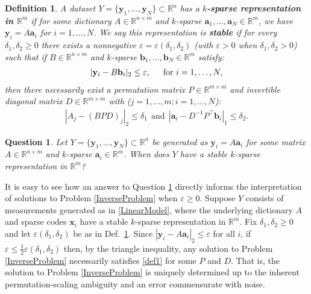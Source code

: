 \documentclass[journal, twocolumn]{IEEEtran}
\newtheorem{question}{Question}
\newtheorem{definition}{Definition}
\begin{document}
\begin{definition}\label{Uniqueness}
A dataset $Y = \{\mathbf{y}_1, \ldots, \mathbf{y}_N\} \subset \mathbb{R}^n$ has a \textbf{$k$-sparse representation in $\mathbb{R}^m$} if for some dictionary $A \in \mathbb{R}^{n \times m}$ and $k$-sparse $\mathbf{a}_1, \ldots, \mathbf{a}_N \in \mathbb{R}^m$, we have $\mathbf{y}_i = A\mathbf{a}_i$ for $i = 1, \ldots, N$. We say this representation is \textbf{stable} if for every $\delta_1, \delta_2 \geq 0$ there exists a nonnegative $\varepsilon = \varepsilon(\delta_1, \delta_2)$ (with $\varepsilon > 0$ when  $\delta_1, \delta_2 > 0$) such that if $B \in \mathbb{R}^{n \times m}$ and $k$-sparse $\mathbf{b}_1, \ldots, \mathbf{b}_N \in \mathbb{R}^m$ satisfy:
\begin{align}\label{y-Bb}
|\mathbf{y}_i - B\mathbf{b}_i|_2 \leq \varepsilon,\indent \text{for } i = 1, \ldots, N,
\end{align}
%
then there necessarily exist a permutation matrix $P \in \mathbb{R}^{m \times m}$ and invertible diagonal matrix $D \in \mathbb{R}^{m \times m}$ with ($j = 1, \ldots, m; i = 1, \ldots, N$):
\begin{align}\label{def1}
|A_j - (BPD)_j|_2 \leq \delta_1 \ \ \text{and} \ \ |\mathbf{a}_i - D^{-1}P^{\top}\mathbf{b}_i|_1 \leq \delta_2.
\end{align}
\end{definition}

\begin{question}\label{DUTproblem}
Let $Y = \{\mathbf{y}_1, \ldots, \mathbf{y}_N \} \subset \mathbb{R}^n$ be generated as $\mathbf{y}_i = A\mathbf{a}_i$ for some matrix $A \in \mathbb{R}^{n \times m}$ and $k$-sparse $\mathbf{a}_i \in \mathbb{R}^m$. When does $Y$ have a stable $k$-sparse representation in $\mathbb{R}^m$?
\end{question}

It is easy to see how an answer to Question \ref{DUTproblem} directly informs the interpretation of solutions to Problem \ref{InverseProblem} when $\varepsilon \geq 0$. Suppose $Y$ consists of measurements generated as in \eqref{LinearModel}, where the underlying dictionary $A$ and sparse codes $\mathbf{x}_i$ have a stable $k$-sparse representation in $\mathbb{R}^m$. Fix $\delta_1, \delta_2 \geq 0$ and let $\varepsilon(\delta_1, \delta_2)$ be as in Def.~\ref{Uniqueness}. Since $|\mathbf{y}_i - A\mathbf{a}_i|_2 \leq \varepsilon$ for all $i$, if $\varepsilon \leq \frac{1}{2}\varepsilon(\delta_1, \delta_2)$ then, by the triangle inequality, any solution to Problem \ref{InverseProblem} necessarily satisfies \eqref{def1} for some $P$ and $D$. That is, the solution to Problem \ref{InverseProblem} is uniquely determined up to the inherent permutation-scaling ambiguity and an error commensurate with noise.
\end{document}
